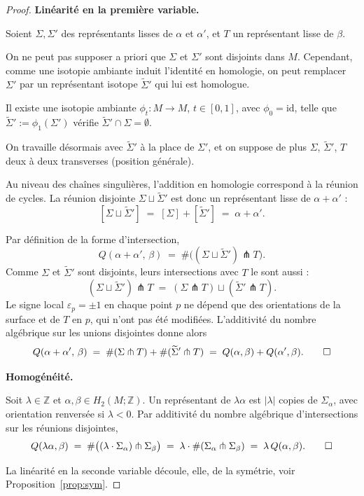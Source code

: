 \begin{proof}
\medskip
\textbf{Linéarité en la première variable.}

Soient $\Sigma, \Sigma'$ des représentants lisses de $\alpha$ et $\alpha'$,
et $T$ un représentant lisse de $\beta$.
 
\medskip
On ne peut pas supposer a priori que $\Sigma$ et $\Sigma'$ sont disjoints dans
$M$.  Cependant, comme une isotopie ambiante induit l'identité en homologie, on
peut remplacer $\Sigma'$ par un représentant isotope $\widetilde\Sigma'$ qui lui
est homologue.
 
\begin{lemma}
Il existe une isotopie ambiante $\phi_t : M \to M$, $t \in [0,1]$, avec
$\phi_0 = \mathrm{id}$, telle que $\widetilde\Sigma' := \phi_1(\Sigma')$
vérifie $\widetilde\Sigma' \cap \Sigma = \emptyset$.
\end{lemma} 
 
On travaille désormais avec $\widetilde\Sigma'$ à la place de $\Sigma'$,
et on suppose de plus $\Sigma$, $\widetilde\Sigma'$, $T$ deux à deux transverses
(position générale).
 
\medskip
Au niveau des chaînes singulières, l'addition en homologie correspond à la
réunion de cycles.  La réunion disjointe $\Sigma \sqcup \widetilde\Sigma'$ est
donc un représentant lisse de $\alpha + \alpha'$ :
\[
  [\Sigma \sqcup \widetilde\Sigma'] \;=\; [\Sigma] + [\widetilde\Sigma']
  \;=\; \alpha + \alpha'.
\]
 
\medskip
Par définition de la forme d'intersection,
\[
  Q(\alpha+\alpha',\,\beta)
  \;=\; \#\bigl((\Sigma \sqcup \widetilde\Sigma') \pitchfork T\bigr).
\]
Comme $\Sigma$ et $\widetilde\Sigma'$ sont disjoints, leurs intersections avec
$T$ le sont aussi :
\[
  (\Sigma \sqcup \widetilde\Sigma') \pitchfork T
  \;=\; (\Sigma \pitchfork T) \sqcup (\widetilde\Sigma' \pitchfork T).
\]
Le signe local $\varepsilon_p = \pm 1$ en chaque point $p$ ne dépend que des
orientations de la surface et de $T$ en $p$, qui n'ont pas été modifiées.
L'additivité du nombre algébrique sur les unions disjointes donne alors
\[
  Q(\alpha+\alpha',\,\beta)
  \;=\; \#(\Sigma \pitchfork T) + \#(\widetilde\Sigma' \pitchfork T)
  \;=\; Q(\alpha,\beta) + Q(\alpha',\beta). \qedhere
\]


\textbf{Homogénéité.}

Soit $\lambda \in \mathbb{Z}$ et $\alpha, \beta \in H_2(M;\mathbb{Z})$.
Un représentant de $\lambda \alpha$ est $|\lambda|$ copies de $\Sigma_\alpha$,
avec orientation renversée si $\lambda < 0$. Par additivité du nombre algébrique
d'intersections sur les réunions disjointes,
\[
  Q(\lambda\alpha, \beta)
  \;=\; \#\bigl((\lambda \cdot \Sigma_\alpha) \pitchfork \Sigma_\beta\bigr)
  \;=\; \lambda \cdot \#(\Sigma_\alpha \pitchfork \Sigma_\beta)
  \;=\; \lambda\, Q(\alpha, \beta). \qedhere
\]

La linéarité en la seconde variable découle, elle, de la symétrie, voir Proposition~\ref{prop:sym}.
\end{proof}

